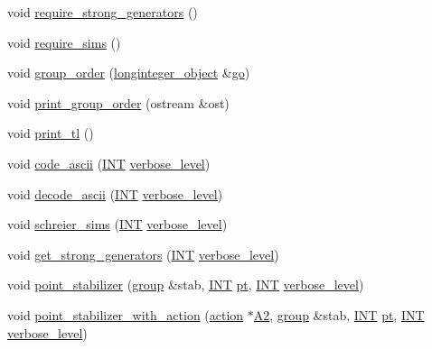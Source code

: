 \begin{DoxyCompactItemize}
\item 
void \mbox{\hyperlink{classgroup_adfc3de74ab859ba6dba668b50efaf392}{require\+\_\+strong\+\_\+generators}} ()
\item 
void \mbox{\hyperlink{classgroup_a657b3eaca7a2fd46ffb25589f06532d6}{require\+\_\+sims}} ()
\item 
void \mbox{\hyperlink{classgroup_a2d70bcf6a1495e7fb8e16ba7dfadb725}{group\+\_\+order}} (\mbox{\hyperlink{classlonginteger__object}{longinteger\+\_\+object}} \&\mbox{\hyperlink{simeon_8_c_a1516b736c8ebbfb03a9dd7d8826cd9a6}{go}})
\item 
void \mbox{\hyperlink{classgroup_aa43ecff562ccdcb7305ace4e7414f3d8}{print\+\_\+group\+\_\+order}} (ostream \&ost)
\item 
void \mbox{\hyperlink{classgroup_ae4b8fab1ef41830cf7677ad0d6408801}{print\+\_\+tl}} ()
\item 
void \mbox{\hyperlink{classgroup_abb93ebcd087d3f1146f32c2b5203f913}{code\+\_\+ascii}} (\mbox{\hyperlink{galois_8h_a09fddde158a3a20bd2dcadb609de11dc}{I\+NT}} \mbox{\hyperlink{simeon_8_c_a818073fbcc2f439e7c56952f67386122}{verbose\+\_\+level}})
\item 
void \mbox{\hyperlink{classgroup_aaf998199131855804b53c8fc917a187f}{decode\+\_\+ascii}} (\mbox{\hyperlink{galois_8h_a09fddde158a3a20bd2dcadb609de11dc}{I\+NT}} \mbox{\hyperlink{simeon_8_c_a818073fbcc2f439e7c56952f67386122}{verbose\+\_\+level}})
\item 
void \mbox{\hyperlink{classgroup_a224ed784f302897ca0c0e578446afa08}{schreier\+\_\+sims}} (\mbox{\hyperlink{galois_8h_a09fddde158a3a20bd2dcadb609de11dc}{I\+NT}} \mbox{\hyperlink{simeon_8_c_a818073fbcc2f439e7c56952f67386122}{verbose\+\_\+level}})
\item 
void \mbox{\hyperlink{classgroup_ad1c87ec4beae45f2acdcf57b754d5617}{get\+\_\+strong\+\_\+generators}} (\mbox{\hyperlink{galois_8h_a09fddde158a3a20bd2dcadb609de11dc}{I\+NT}} \mbox{\hyperlink{simeon_8_c_a818073fbcc2f439e7c56952f67386122}{verbose\+\_\+level}})
\item 
void \mbox{\hyperlink{classgroup_a36f1034ef2d4a7d1e7a5aed426bd4d16}{point\+\_\+stabilizer}} (\mbox{\hyperlink{classgroup}{group}} \&stab, \mbox{\hyperlink{galois_8h_a09fddde158a3a20bd2dcadb609de11dc}{I\+NT}} \mbox{\hyperlink{clique__finder_8_c_aec1f1a2b30fdca8844c2932384483145}{pt}}, \mbox{\hyperlink{galois_8h_a09fddde158a3a20bd2dcadb609de11dc}{I\+NT}} \mbox{\hyperlink{simeon_8_c_a818073fbcc2f439e7c56952f67386122}{verbose\+\_\+level}})
\item 
void \mbox{\hyperlink{classgroup_a4bf09ea3350d11ee1e0757d0a02ac3cc}{point\+\_\+stabilizer\+\_\+with\+\_\+action}} (\mbox{\hyperlink{classaction}{action}} $\ast$\mbox{\hyperlink{simeon_8_c_a13fda35b8976a20080ec22b9d9e44e5b}{A2}}, \mbox{\hyperlink{classgroup}{group}} \&stab, \mbox{\hyperlink{galois_8h_a09fddde158a3a20bd2dcadb609de11dc}{I\+NT}} \mbox{\hyperlink{clique__finder_8_c_aec1f1a2b30fdca8844c2932384483145}{pt}}, \mbox{\hyperlink{galois_8h_a09fddde158a3a20bd2dcadb609de11dc}{I\+NT}} \mbox{\hyperlink{simeon_8_c_a818073fbcc2f439e7c56952f67386122}{verbose\+\_\+level}})

\end{DoxyCompactItemize}
